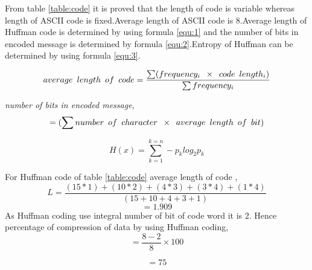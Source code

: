 \documentclass[conference]{IEEEtran}
\begin{document}
From table \ref{table:code} it is proved that the length of code is variable whereas length of ASCII code is fixed.Average length of ASCII code is 8.Average length of Huffman code is determined by using formula \ref{equ:1}\cite{cormen2009introduction} and the number of bits in encoded message is determined by formula \ref{equ:2}\cite{cormen2009introduction}.Entropy of Huffman can be determined by using formula \ref{equ:3}.\cite{howard1994arithmetic}

\begin{equation}
\label{equ:1}
    average\hspace{.5em} length\hspace{.5em} of\hspace{.5em} code  = \frac{\sum (frequency_i \hspace{.5em} \times \hspace{.5em} code\hspace{.5em} length_i)}{\sum frequency_i}
\end{equation}

\textit{number of bits in encoded message,}
\begin{equation}
\label{equ:2}
    =(\sum number\hspace{.5em}of\hspace{.5em}character\hspace{.5em} \times \hspace{.5em} average\hspace{.5em}length\hspace{.5em}of\hspace{.5em}bit)
\end{equation}

\begin{equation}
\label{equ:3}
    H(x)=\sum_{k=1}^{k=n}-p_k log_2p_k
\end{equation}


For Huffman code of table \ref{table:code} average length of code ,\\

 $$ L = \frac{(15*1)+(10*2)+(4*3)+(3*4)+
(1*4)}{(15+10+4+3+1)}$$
$$=1.909 $$
As Huffman coding use integral number of bit of code word it is 2.\cite{nelson1995data}
Hence percentage of compression of data by using Huffman coding, $$=\frac{8-2}{8}\times100$$

$$=75$$
\end{document}
